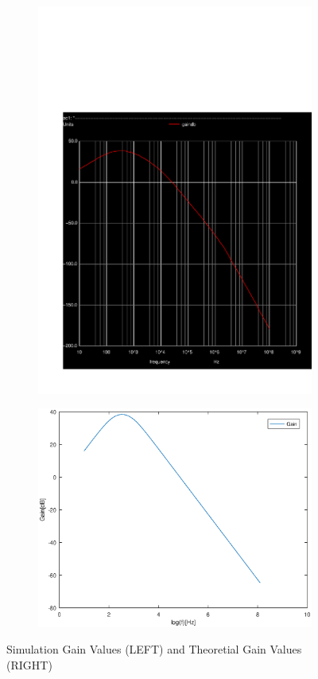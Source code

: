 \vspace{-3cm}

\begin{figure}[ht]
\centering
\begin{subfigure}{.5\textwidth}
  \centering
  \includegraphics[width=0.9\linewidth]{../sim/gain.pdf}
\end{subfigure}%
\begin{subfigure}{.5\textwidth}
  \centering
  \vspace{3cm}
  \includegraphics[width=1\linewidth]{gainteo.eps}
\end{subfigure}
\caption{Simulation Gain Values (LEFT) and Theoretial Gain Values (RIGHT)}
\label{fig:sbs3}
\end{figure}

